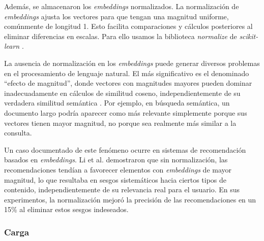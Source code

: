 \documentclass[11pt,a4paper,twoside,openany]{tesis}
\begin{document}
Además, se almacenaron los \emph{embeddings} normalizados. La normalización de \emph{embeddings} ajusta los vectores para que tengan una magnitud uniforme, comúnmente de longitud 1. Esto facilita comparaciones y cálculos posteriores al eliminar diferencias en escalas. Para ello usamos la biblioteca \emph{normalize} de \emph{scikit-learn} \cite{sklearn_normalize}.

La ausencia de normalización en los \emph{embeddings} puede generar diversos problemas en el procesamiento de lenguaje natural. El más significativo es el denominado ``efecto de magnitud'', donde vectores con magnitudes mayores pueden dominar inadecuadamente en cálculos de similitud coseno, independientemente de su verdadera similitud semántica \cite{mu2018all}. Por ejemplo, en búsqueda semántica, un documento largo podría aparecer como más relevante simplemente porque sus vectores tienen mayor magnitud, no porque sea realmente más similar a la consulta.

Un caso documentado de este fenómeno ocurre en sistemas de recomendación basados en \emph{embeddings}. Li et al. \cite{li2020improving} demostraron que sin normalización, las recomendaciones tendían a favorecer elementos con \emph{embeddings} de mayor magnitud, lo que resultaba en sesgos sistemáticos hacia ciertos tipos de contenido, independientemente de su relevancia real para el usuario. En sus experimentos, la normalización mejoró la precisión de las recomendaciones en un 15\% al eliminar estos sesgos indeseados.

\subsubsection{Carga} \textbf{ }
\end{document}
